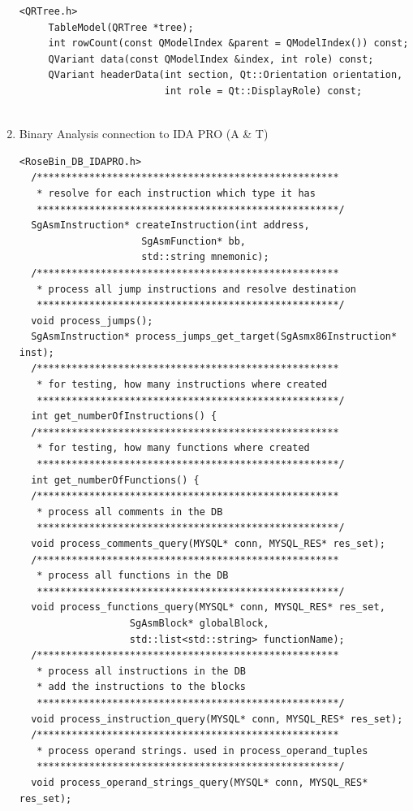 \begin{enumerate}
\begin{lstlisting}
<QRTree.h>
     TableModel(QRTree *tree);
     int rowCount(const QModelIndex &parent = QModelIndex()) const;
     QVariant data(const QModelIndex &index, int role) const;
     QVariant headerData(int section, Qt::Orientation orientation,
                         int role = Qt::DisplayRole) const;


         \end{lstlisting}

   \item Binary Analysis connection to IDA PRO (A \& T)

\begin{lstlisting}
<RoseBin_DB_IDAPRO.h>
  /****************************************************
   * resolve for each instruction which type it has
   ****************************************************/
  SgAsmInstruction* createInstruction(int address, 
					 SgAsmFunction* bb, 
					 std::string mnemonic);
  /****************************************************
   * process all jump instructions and resolve destination
   ****************************************************/
  void process_jumps();
  SgAsmInstruction* process_jumps_get_target(SgAsmx86Instruction* inst);
  /****************************************************
   * for testing, how many instructions where created
   ****************************************************/
  int get_numberOfInstructions() {
  /****************************************************
   * for testing, how many functions where created
   ****************************************************/
  int get_numberOfFunctions() {
  /****************************************************
   * process all comments in the DB
   ****************************************************/
  void process_comments_query(MYSQL* conn, MYSQL_RES* res_set);
  /****************************************************
   * process all functions in the DB
   ****************************************************/
  void process_functions_query(MYSQL* conn, MYSQL_RES* res_set,
			       SgAsmBlock* globalBlock,
			       std::list<std::string> functionName);
  /****************************************************
   * process all instructions in the DB
   * add the instructions to the blocks
   ****************************************************/
  void process_instruction_query(MYSQL* conn, MYSQL_RES* res_set);
  /****************************************************
   * process operand strings. used in process_operand_tuples
   ****************************************************/
  void process_operand_strings_query(MYSQL* conn, MYSQL_RES* res_set);

\end{lstlisting}
\end{enumerate}

